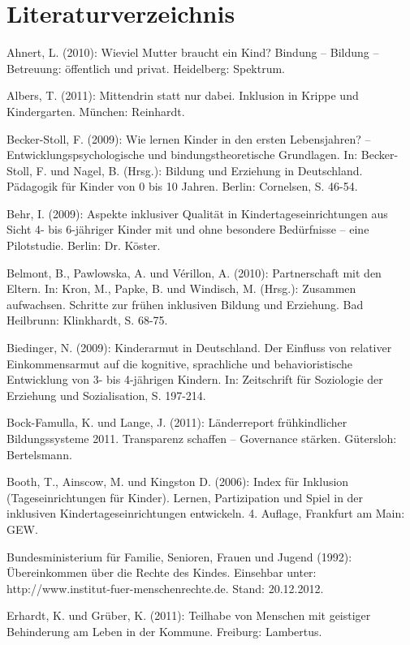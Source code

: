 \chapter*{Literaturverzeichnis}

Ahnert, L. (2010): Wieviel Mutter braucht ein Kind? Bindung – Bildung – Betreuung: öffentlich und privat. Heidelberg: Spektrum.

Albers, T. (2011): Mittendrin statt nur dabei. Inklusion in Krippe und Kindergarten. München: Reinhardt.

Becker-Stoll, F. (2009): Wie lernen Kinder in den ersten Lebensjahren? – Entwicklungspsychologische und bindungstheoretische Grundlagen. In: Becker-Stoll, F. und Nagel, B. (Hrsg.): Bildung und Erziehung in Deutschland. Pädagogik für Kinder von 0 bis 10 Jahren. Berlin: Cornelsen, S. 46-54.

Behr, I. (2009): Aspekte inklusiver Qualität in Kindertageseinrichtungen aus Sicht 4- bis 6-jähriger Kinder mit und ohne besondere Bedürfnisse – eine Pilotstudie. Berlin: Dr. Köster.

Belmont, B., Pawlowska, A. und Vérillon, A. (2010):
Partnerschaft mit den Eltern. In: Kron, M., Papke, B. und Windisch, M. (Hrsg.): Zusammen aufwachsen. Schritte zur frühen inklusiven Bildung und Erziehung. Bad Heilbrunn: Klinkhardt, S. 68-75.

Biedinger, N. (2009): Kinderarmut in Deutschland. Der Einfluss von relativer Einkommensarmut auf die kognitive, sprachliche und behavioristische Entwicklung von 3- bis 4-jährigen Kindern. In:  Zeitschrift für Soziologie der Erziehung und Sozialisation, S. 197-214.


Bock-Famulla, K. und Lange, J. (2011): Länderreport frühkindlicher Bildungssysteme 2011. Transparenz schaffen – Governance stärken.
Gütersloh: Bertelsmann.

Booth, T., Ainscow, M. und Kingston D. (2006): Index für Inklusion (Tageseinrichtungen für Kinder). Lernen, Partizipation und Spiel in der inklusiven Kindertageseinrichtungen entwickeln. 4. Auflage, Frankfurt am Main: GEW. 

Bundesministerium für Familie, Senioren, Frauen und Jugend (1992): Übereinkommen über die Rechte des Kindes. Einsehbar unter: http://www.institut-fuer-menschenrechte.de. Stand: 20.12.2012.

Erhardt, K. und Grüber, K. (2011): Teilhabe von Menschen mit geistiger Behinderung am Leben in der Kommune. Freiburg: Lambertus.

